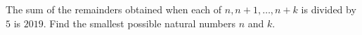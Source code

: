 The sum of the remainders obtained when each of $n,n+1,\dots,n+k$ is divided by $5$ is $2019$. Find the smallest possible natural numbers $n$ and $k$.
